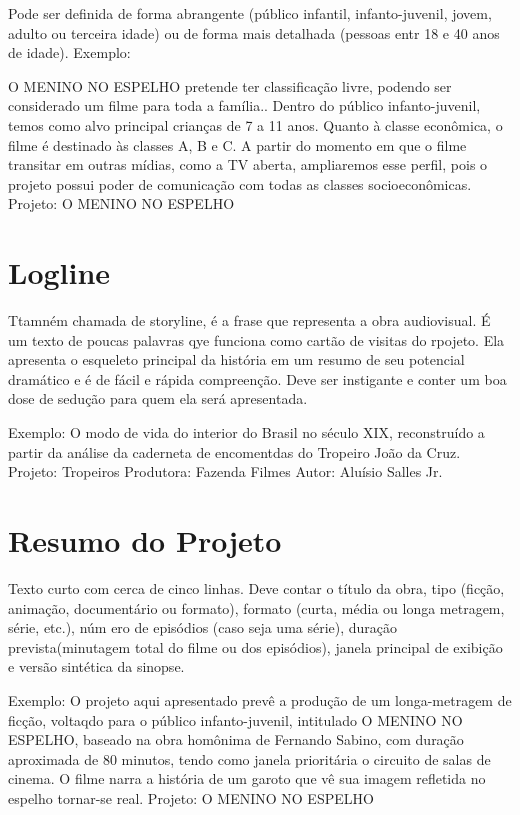 Pode ser definida de forma abrangente (público infantil, infanto-juvenil, jovem, adulto ou terceira idade) ou de forma mais detalhada (pessoas entr 18 e 40 anos de idade).
Exemplo:

O MENINO NO ESPELHO pretende ter classificação livre, podendo ser considerado um filme para toda a família.. Dentro do público infanto-juvenil, temos como alvo principal crianças de 7 a 11 anos. Quanto à classe econômica, o filme é destinado às classes A, B e C. A partir do momento em que o filme transitar em outras mídias, como a TV aberta, ampliaremos esse perfil, pois o projeto possui poder de comunicação com todas as classes socioeconômicas.
Projeto: O MENINO NO ESPELHO

\section{Logline}
Ttamném chamada de storyline, é a frase que representa a obra audiovisual. É um texto de poucas palavras qye funciona como cartão de visitas do rpojeto. Ela apresenta o esqueleto principal da história em um resumo de seu potencial dramático e é de fácil e rápida compreenção. Deve ser instigante e conter um boa dose de sedução para quem ela será apresentada.

Exemplo:
O modo de vida do interior do Brasil no século XIX, reconstruído a partir da análise da caderneta de encomentdas do Tropeiro João da Cruz.
Projeto: Tropeiros
Produtora: Fazenda Filmes
Autor: Aluísio Salles Jr.

\section{Resumo do Projeto}

Texto curto com cerca de cinco linhas. Deve contar o título da obra, tipo (ficção, animação, documentário ou formato), formato (curta, média ou longa metragem, série, etc.), núm
ero de episódios (caso seja uma série), duração prevista(minutagem total do filme ou dos episódios), janela principal de exibição e versão sintética da sinopse.

Exemplo:
O projeto aqui apresentado prevê a produção de um longa-metragem de ficção, voltaqdo para o público infanto-juvenil, intitulado O MENINO NO ESPELHO, baseado na obra homônima de Fernando Sabino, com duração aproximada de 80 minutos, tendo como janela prioritária o circuito de salas de cinema. O filme narra a história de um garoto que vê sua imagem refletida no espelho tornar-se real.
Projeto: O MENINO NO ESPELHO

